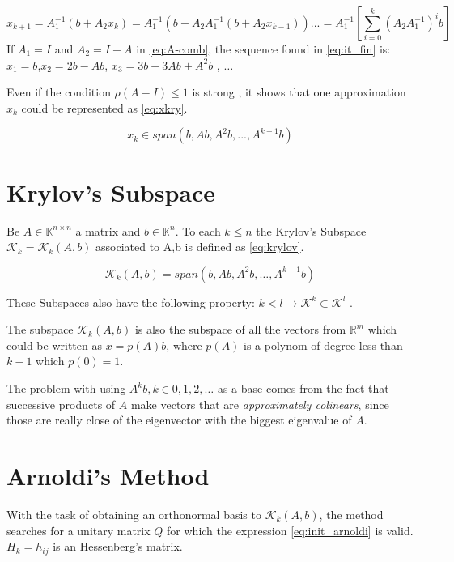     \begin{equation}\label{eq:it_fin}
        x_{k+1} = A_{1}^{-1}(b + A_{2}x_{k}) = A_{1}^{-1}(b + A_{2}A_{1}^{-1}(b + A_{2}x_{k-1}))... = A_{1}^{-1} \left[ \sum_{i=0}^{k} (A_{2}A_{1}^{-1})^{i}b\right]
    \end{equation}
    If $A_{1} = I$ and $A_{2} = I - A$ in \ref{eq:A-comb}, the sequence found in \ref{eq:it_fin} is: $x_{1} = b$,$x_{2} = 2b- Ab$, $x_{3} = 3b-3Ab+A^{2}b$ , $\dots$

    Even if the condition $\rho(A-I) \leq 1$ is strong \cite{bonnet}, it shows that one approximation $x_{k}$ could be represented as \ref{eq:xkry}.
    
    \begin{equation}\label{eq:xkry}
        x_{k} \in span(b,Ab,A^{2}b,...,A^{k-1}b)
    \end{equation}

    \section{Krylov's Subspace}
    Be $A \in \mathbb{K}^{n \times n}$ a matrix and $b\in \mathbb{K}^{n}$. To each $k\leq n$ the Krylov's Subspace $\mathcal{K}_{k}=\mathcal{K}_{k}(A,b)$ associated to A,b is defined as \ref{eq:krylov}.

    \begin{equation}\label{eq:krylov}
        \mathcal{K}_{k}(A,b) = span(b,Ab,A^{2}b,\dots , A^{k-1}b)
    \end{equation}

    These Subspaces also have the following property: $k<l \to \mathcal{K}^{k} \subset \mathcal{K}^{l}$ \cite{bonnet}.

    The subspace $\mathcal{K}_{k}(A,b)$ is also the subspace of all the vectors from $\mathbb{R}^{m}$ which could be written as $x=p(A)b$, where $p(A)$ is a polynom of degree less than $k-1$ which $p(0)=1$.

    The problem with using ${A^{k}b}, k \in {0,1,2,\dots}$ as a base comes from the fact that successive products of $A$ make vectors that are \textit{approximately colinears}, since those are really close of the eigenvector with the biggest eigenvalue of $A$.

    \section{Arnoldi's Method}
    
    With the task of obtaining an orthonormal basis to $\mathcal{K}_{k}(A,b)$, the method searches for a unitary matrix $Q$ for which the expression \ref{eq:init_arnoldi} is valid. $H_{k}={h_{ij}}$ is an Hessenberg's matrix.


